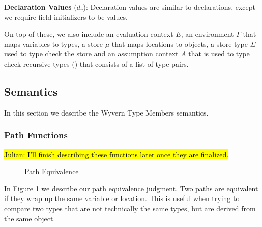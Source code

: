 \documentclass[a4paper,UKenglish]{lipics}
\begin{document}
\textbf{Declaration Values} ($d_v$): Declaration values are similar to 
declarations, except we require field initializers to be values.

On top of these, we also include an evaluation context $E$, an environment 
$\Gamma$ that maps variables to types, a store $\mu$ that maps locations 
to objects, a store type $\Sigma$ used to type check the store and an 
assumption context $A$ that is used to type check recursive types (\cite{Amber Rules etc})
that consists of a list of type pairs.



\subsection{Semantics}
In this section we describe the Wyvern Type Members semantics.
\subsubsection{Path Functions}

\hl{Julian: I'll finish describing these functions later once they are finalized.}

\begin{figure}[h]
\caption{Path Equivalence}
\label{f:path_equiv}
\end{figure}
In Figure \ref{f:path_equiv} we describe our path equivalence judgment. Two paths are equivalent if they wrap up the same variable or location. This is useful when trying to compare two types that are not technically the same types, but are derived from the same object.
\end{document}
